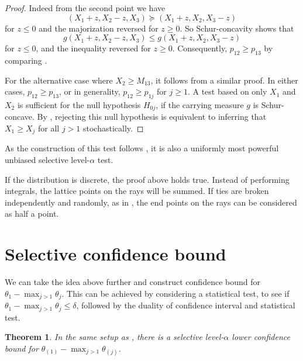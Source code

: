 \documentclass[11pt]{article}
\newtheorem{theorem}{Theorem}
\begin{document}
\begin{proof}
Indeed from the second point  we have
$$\left(X_1 + z, X_2 - z, X_3\right) \succeq \left(X_1 + z, X_2, X_3 - z\right)$$
for $z \le 0$ and the majorization reversed for $z \ge 0$. So Schur-concavity shows that
$$g\left(X_1 + z, X_2 - z, X_3\right) \le g\left(X_1 + z, X_2, X_3 - z\right)$$
for $z \le 0$, and the inequality reversed for $z \ge 0$. Consequently, $p_{12} \ge p_{13}$ by comparing .

For the alternative case where $X_2 \ge M_{13}$, it follows from a similar proof. In either cases, $p_{12} \ge p_{13}$, or in generality, $p_{12} \ge p_{1j}$ for $j \ge 1$. A test based on only $X_1$ and $X_2$ is sufficient for the null hypothesis $H_{0j}$, if the carrying measure $g$ is Schur-concave. By , rejecting this null hypothesis is equivalent to inferring that $X_1 \ge X_j$ for all $j>1$ stochastically.

\end{proof}

As the construction of this test follows \cite{Fithian:2014ws}, it is also a uniformly most powerful unbiased selective level-$\alpha$ test.

If the distribution is discrete, the proof above holds true. Instead of performing integrals, the lattice points on the rays will be summed. If ties are broken independently and randomly, as in , the end points on the rays can be considered as half a point.

\section{Selective confidence bound}
\label{sec:selective_confidence_bound}

We can take the idea above further and construct confidence bound for $\theta_1 - \max_{j>1} \theta_j$. This can be achieved by considering a statistical test, to see if $\theta_1 - \max_{j>1} \theta_j \le \delta$, followed by the duality of confidence interval and statistical test.

\begin{theorem}
In the same setup as , there is a selective level-$\alpha$ lower confidence bound for $\theta_{\left(1\right)} - \max_{j>1} \theta_{\left(j\right)}$.
\end{theorem}
\end{document}
